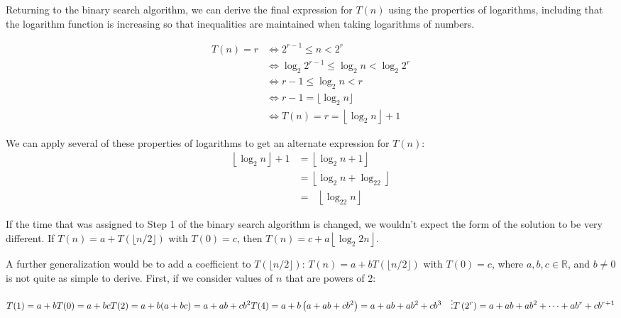 \documentclass[10pt,]{book}
\theoremstyle{plain}
\theoremstyle{definition}
\theoremstyle{definition}
\theoremstyle{definition}
\theoremstyle{definition}
\numberwithin{equation}{section}
\begin{document}
\subsubsection[ ]{ }\label{subsubsection-3}
Returning to the binary search algorithm, we can derive the final expression for \(T(n)\) using the properties of logarithms, including that the
logarithm function is increasing so that inequalities are maintained when taking logarithms of numbers.%
\par

\begin{equation*}
\begin{split}
T(n)= r & \Leftrightarrow 2^{r-1}\leq n < 2^r\\
	& \Leftrightarrow  \log_2 2^{r-1} \leq \log_2 n < \log_2 2^r\\
	& \Leftrightarrow  r-1 \leq \log_2 n < r\\
	& \Leftrightarrow  r-1 = \lfloor \log_2 n\rfloor \\
	& \Leftrightarrow  T(n) = r= \left\lfloor \log_2 n\right\rfloor +1
\end{split}
\end{equation*}
%
\par
We can apply several of these properties of logarithms to get an alternate expression for \(T(n)\):
\begin{equation*}
\begin{split}
\left\lfloor \log_2n\right\rfloor +1 &= \left\lfloor \log_2n+1\right\rfloor \\
		& = \left\lfloor \log_2n + \log_22\right\rfloor \\
		&  =\text{  }\left\lfloor \log_22n \right\rfloor 
\end{split}
\end{equation*}
%
\par
If the time that was assigned to Step 1 of the binary search algorithm is changed, we wouldn't expect the form of the solution to be very different. If \(T(n)= a + T (\lfloor n/2 \rfloor )\) with \(T(0) = c\), then \(T(n) = c + a \left\lfloor \log_2{2n}\right\rfloor\).%
\par
A further generalization would be to add a coefficient to \(T(\lfloor n/2 \rfloor )\): \(T(n)= a + b T (\lfloor n/2 \rfloor )\) with \(T(0) = c\),
where \(a, b, c\in \mathbb{R}\), and \(b\neq 0\) is not quite as simple to derive. First, if we consider values of \(n\) that are powers of 2:



\begin{equation*}
T(1) = a + b T(0) = a + b c\\
\\
T(2)=a + b(a+b c) = a + a b +c b^2\\
\\
T(4)=a+b\left(a + a b +c b^2\right) = a + a b + a b^2+ c b^3\\
\\
\quad \vdots \\
\\
T\left(2^r\right) = a + a b + a b^2+\cdots  + a b^r + c b^{r+1}\end{equation*}
\end{document}
